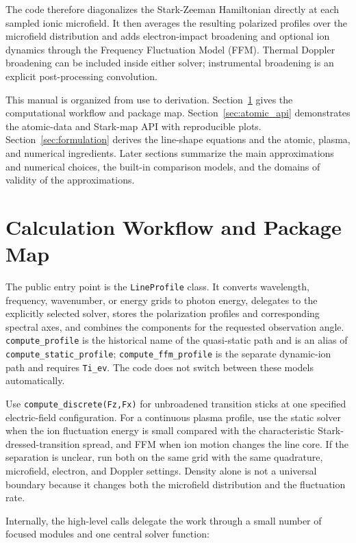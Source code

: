 \documentclass[11pt,a4paper]{article}
\numberwithin{equation}{section}
\begin{document}
The code therefore diagonalizes the Stark-Zeeman Hamiltonian directly at each sampled ionic microfield.  It then averages the resulting polarized profiles over the microfield distribution and adds electron-impact broadening and optional ion dynamics through the Frequency Fluctuation Model (FFM). Thermal Doppler broadening can be included inside either solver; instrumental broadening is an explicit post-processing convolution.

This manual is organized from use to derivation. Section~\ref{sec:workflow} gives the computational workflow and package map. Section~\ref{sec:atomic_api} demonstrates the atomic-data and Stark-map API with reproducible plots. Section~\ref{sec:formulation} derives the line-shape equations and the atomic, plasma, and numerical ingredients. Later sections summarize the main approximations and numerical choices, the built-in comparison models, and the domains of validity of the approximations.

\section{Calculation Workflow and Package Map}
\label{sec:workflow}

The public entry point is the \texttt{LineProfile} class.  It converts wavelength, frequency, wavenumber, or energy grids to photon energy, delegates to the explicitly selected solver, stores the polarization profiles and corresponding spectral axes, and combines the components for the requested observation angle. \texttt{compute\_profile} is the historical name of the quasi-static path and is an alias of \texttt{compute\_static\_profile}; \texttt{compute\_ffm\_profile} is the separate dynamic-ion path and requires \texttt{Ti\_ev}. The code does not switch between these models automatically.

Use \texttt{compute\_discrete(Fz,Fx)} for unbroadened transition sticks at one specified electric-field configuration. For a continuous plasma profile, use the static solver when the ion fluctuation energy is small compared with the characteristic Stark-dressed-transition spread, and FFM when ion motion changes the line core. If the separation is unclear, run both on the same grid with the same quadrature, microfield, electron, and Doppler settings. Density alone is not a universal boundary because it changes both the microfield distribution and the fluctuation rate.

Internally, the high-level calls delegate the work through a small number of focused modules and one central solver function:
\end{document}
